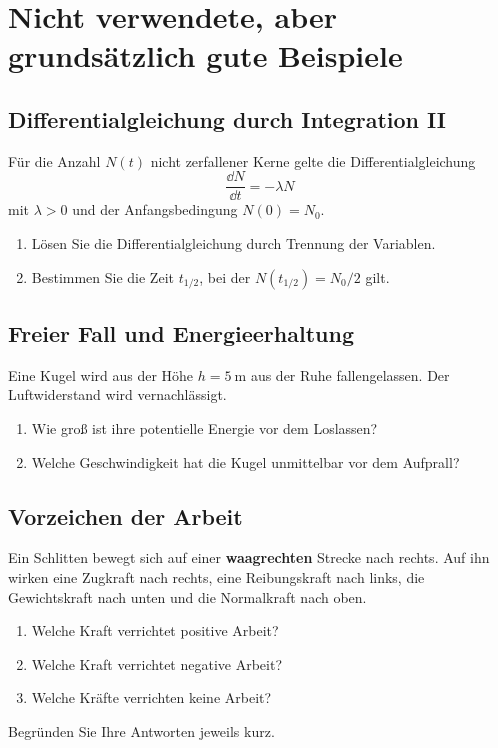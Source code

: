 \documentclass[11pt, a4paper]{article}
\begin{document}
\section*{Nicht verwendete, aber grundsätzlich gute Beispiele}

\subsection*{Differentialgleichung durch Integration II}

Für die Anzahl $N(t)$ nicht zerfallener Kerne gelte die Differentialgleichung
\[
    \frac{\dd N}{\dd t} = -\lambda N
\]
mit $\lambda > 0$ und der Anfangsbedingung $N(0)=N_0$.
\begin{enumerate}[label=(\alph*)]
    \item Lösen Sie die Differentialgleichung durch Trennung der Variablen.
    \item Bestimmen Sie die Zeit $t_{1/2}$, bei der $N(t_{1/2}) = N_0/2$ gilt.
\end{enumerate}

\subsection*{Freier Fall und Energieerhaltung}

Eine Kugel wird aus der Höhe $h = \SI{5}{\meter}$ aus der Ruhe fallengelassen. Der Luftwiderstand wird vernachlässigt.
\begin{enumerate}[label=(\alph*)]
    \item Wie groß ist ihre potentielle Energie vor dem Loslassen?
    \item Welche Geschwindigkeit hat die Kugel unmittelbar vor dem Aufprall?
\end{enumerate}

\subsection*{Vorzeichen der Arbeit}

Ein Schlitten bewegt sich auf einer \textbf{waagrechten} Strecke nach rechts. Auf ihn wirken eine Zugkraft nach rechts, eine Reibungskraft nach links, die Gewichtskraft nach unten und die Normalkraft nach oben.
\begin{enumerate}[label=(\alph*)]
    \item Welche Kraft verrichtet positive Arbeit?
    \item Welche Kraft verrichtet negative Arbeit?
    \item Welche Kräfte verrichten keine Arbeit?
\end{enumerate}
Begründen Sie Ihre Antworten jeweils kurz.
\end{document}
